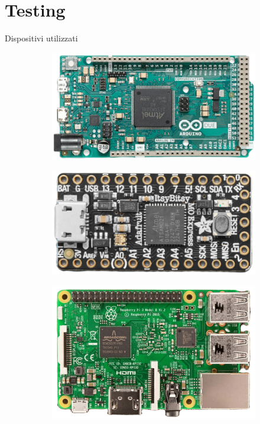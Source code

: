 \section{Testing}


\begin{frame}{Dispositivi utilizzati}

\begin{figure}
    \centering
    \begin{subfigure}[m]{0.30\textwidth}
        \centering
        \includegraphics[height=0.49\textwidth]{images/arduino.png}
    \end{subfigure}
    \hfill \hfill \hfill
    \begin{subfigure}[m]{0.36\textwidth}
        \centering
        \includegraphics[height=0.40\textwidth]{images/adafruit.png}
    \end{subfigure}
    \hfill
    \begin{subfigure}[m]{0.30\textwidth}
    \centering
        \includegraphics[height=0.48\textwidth]{images/raspberry.png}
    \end{subfigure}
\end{figure}

\end{frame}

